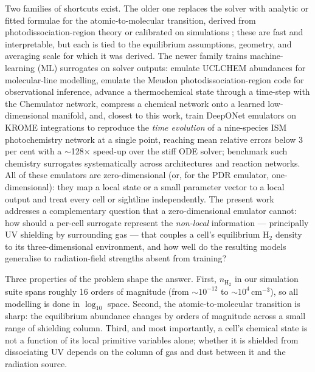 \documentclass[fleqn,usenatbib]{rasti}
\newcommand{\nHH}{n_{\mathrm{H_2}}}
\begin{document}
Two families of shortcuts exist. The older one replaces the solver with
analytic or fitted formulae for the atomic-to-molecular transition,
derived from photodissociation-region theory or calibrated on
simulations \citep{Krumholz2009,Gnedin2011,Sternberg2014,Bialy2016};
these are fast and interpretable, but each is tied to the equilibrium
assumptions, geometry, and averaging scale for which it was derived. The
newer family trains machine-learning (ML) surrogates on solver outputs:
\citet{deMijolla2019} emulate UCLCHEM abundances for molecular-line
modelling, \citet{Palud2023} emulate the Meudon photodissociation-region
code for observational inference, \citet{Holdship2021} advance a
thermochemical state through a time-step with the Chemulator network,
\citet{Grassi2022} compress a chemical network onto a learned
low-dimensional manifold, and, closest to this work, \citet{Branca2024}
train DeepONet emulators on KROME \citep{Grassi2014} integrations to
reproduce the \emph{time evolution} of a nine-species ISM photochemistry
network at a single point, reaching mean relative errors below 3 per
cent with a \(\sim\)128\(\times\) speed-up over the stiff ODE solver;
\citet{Janssen2026} benchmark such chemistry surrogates systematically
across architectures and reaction networks. All of these emulators are
zero-dimensional (or, for the PDR emulator, one-dimensional): they map a
local state or a small parameter vector to a local output and treat
every cell or sightline independently. The present work addresses a complementary question
that a zero-dimensional emulator cannot: how should a per-cell surrogate
represent the \emph{non-local} information --- principally UV shielding
by surrounding gas \citep[cf.][]{Glover2007,Glover2010} --- that couples
a cell's equilibrium H\(_2\) density to its three-dimensional environment,
and how well do the resulting models generalise to radiation-field
strengths absent from training?

Three properties of the problem shape the answer. First, \(\nHH\) in our
simulation suite spans roughly 16 orders of magnitude (from
\(\sim\)\(10^{-12}\) to \(\sim\)\(10^{4}\)\,cm\(^{-3}\)), so all modelling is done
in \(\log_{10}\) space. Second, the atomic-to-molecular transition is
sharp: the equilibrium abundance changes by orders of magnitude across a
small range of shielding column. Third, and most importantly, a cell's
chemical state is not a function of its local primitive variables alone;
whether it is shielded from dissociating UV depends on the column of gas
and dust between it and the radiation source.
\end{document}
